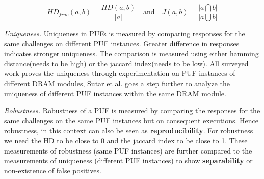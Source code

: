 \documentclass[journal, a4paper]{IEEEtran}
\begin{document}
\[ HD_{frac}(a,b) = \dfrac{HD(a,b)}{|a|} \quad\text{and}\quad J(a,b) = \dfrac{| a \bigcap b |}{| a \bigcup b |} \]

\textit{Uniqueness.} Uniqueness in PUFs is measured by comparing responses for the same challenges on different PUF instances. Greater difference in responses indicates stronger uniqueness.  The comparison is measured using either hamming distance(needs to be high) or the jaccard index(needs to be low). All surveyed work proves the uniqueness through experimentation on PUF instances of different DRAM modules, Sutar et al. goes a step further to analyze the uniqueness of different PUF instances within the same DRAM module.




\textit{Robustness.} Robustness of a PUF is measured by comparing the responses for the same challenges on the same PUF instances but on consequent executions. Hence robustness, in this context can also be seen as \textbf{reproducibility}. For robustness we need the HD to be close to 0 and the jaccard index to be close to 1. These measurements of robustness (same PUF instances) are further compared to the measurements of uniqueness (different PUF instances) to show \textbf{separability} or non-existence of false positives.
\end{document}
